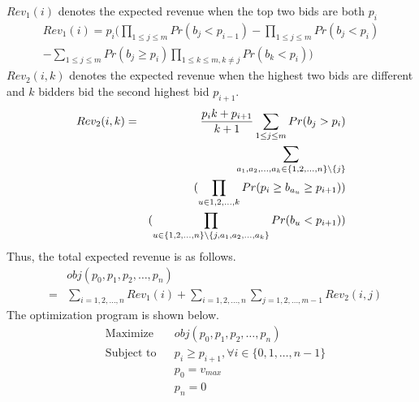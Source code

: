 \documentclass[letterpaper]{article}
\begin{document}
$Rev_1(i)$ denotes the expected revenue when the top two bids are both $p_i$
\begin{eqnarray}
&Rev_1(i)=p_i(\prod_{1\leq j\leq m}Pr(b_j<p_{i-1})-\prod_{1\leq j\leq m}Pr(b_j<p_i)&\nonumber\\
&-\sum_{1\leq j\leq m}Pr(b_j\geq p_i)\prod_{1\leq k\leq m,k\neq j}Pr(b_k< p_i))&\nonumber
\end{eqnarray}
$Rev_2(i,k)$ denotes the expected revenue when the highest two bids are different and $k$ bidders bid the second highest bid $p_{i+1}$.
\begin{eqnarray}
\small
Rev_2(i,k)&=&\frac{p_i k+p_{i+1}}{k+1}\sum_{1\leq j\leq m}Pr(b_j>p_i)\nonumber\\
&&\sum_{a_1,a_2,\ldots, a_k\in \{1,2,\ldots,n\}\backslash\{j\}}\nonumber\\
&&(\prod_{u\in 1,2,\ldots, k}Pr(p_i\geq b_{a_u}\geq p_{i+1}))\nonumber\\
&&(\prod_{u\in \{1,2,\ldots,n\}\backslash\{j,a_1,a_2,\ldots,a_k\}}Pr(b_u<p_{i+1}))\nonumber
\end{eqnarray}
Thus, the total expected revenue is as follows.
\begin{eqnarray}
& & obj(p_0,p_1,p_2,\ldots,p_n)\nonumber\\
&=&\sum_{i=1,2,\ldots,n}Rev_1(i)+\sum_{i=1,2,\ldots,n}\sum_{j=1,2,\ldots,m-1}Rev_2(i,j)\nonumber
\end{eqnarray}
The optimization program is shown below.
\begin{equation*}
\begin{aligned}
& \text{Maximize}
& & obj(p_0,p_1,p_2,\ldots,p_n) \\
& \text{Subject to}
& & p_i\geq p_{i+1},\forall i\in\{0,1,\ldots,n-1\}\\
&&& p_0=v_{max}\\
&&& p_{n}=0
\end{aligned}
\end{equation*}
\end{document}
